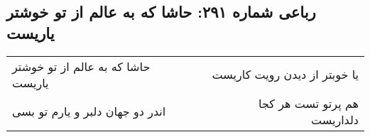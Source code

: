 \begin{center}
\section*{رباعی شماره ۲۹۱: حاشا که به عالم از تو خوشتر یاریست}
\label{sec:0291}
\begin{longtable}{l p{0.5cm} r}
حاشا که به عالم از تو خوشتر یاریست
&&
یا خوبتر از دیدن رویت کاریست
\\
اندر دو جهان دلبر و یارم تو بسی
&&
هم پرتو تست هر کجا دلداریست
\\
\end{longtable}
\end{center}
